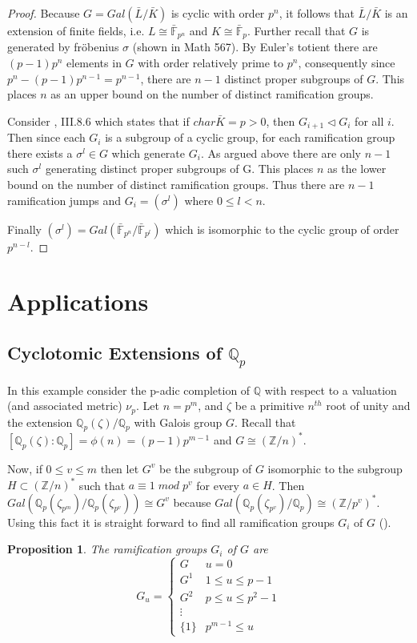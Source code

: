 \documentclass[paper=a4, fontsize=11pt]{scrartcl} %
\numberwithin{equation}{section} %
\numberwithin{figure}{section} %
\numberwithin{table}{section} %
\theoremstyle{break}
\newtheorem{prop}{Proposition}
\begin{document}
\begin{proof}
 Because $G=Gal(\bar{L}/\bar{K})$ is cyclic with order $p^n$, it follows that $\bar{L}/\bar{K}$ is an extension of finite fields, i.e. $L\cong \bar{\mathbb{F}}_{p^n}$ and $K\cong \bar{\mathbb{F}}_p$. Further recall that $G$ is generated by fr\"{o}benius $\sigma$ (shown in Math 567). By Euler's totient there are $(p-1)p^n$ elements in $G$ with order relatively prime to $p^n$, consequently since $p^n-(p-1)p^{n-1}=p^{n-1}$, there are $n-1$ distinct proper subgroups of $G$. This places $n$ as an upper bound on the number of distinct ramification groups.

Consider \cite{stitchenoth}, III.8.6 which states that if $char{\bar{K}} =p>0$, then $G_{i+1} \triangleleft G_i$ for all $i$. Then since each $G_i$ is a subgroup of a cyclic group, for each ramification group there exists a $\sigma^l\in G$ which generate $G_i$. As argued above there are only $n-1$ such $\sigma^{l}$ generating distinct proper subgroups of G. This places $n$ as the lower bound on the number of distinct ramification groups. Thus there are $n-1$ ramification jumps and $G_i = (\sigma^l)$ where $0 \leq l < n$.

Finally $(\sigma^l)=Gal(\bar{\mathbb{F}}_{p^n}/\bar{\mathbb{F}}_{p^l})$ which is isomorphic to the cyclic group of order $p^{n-l}$.
\end{proof}

\section{Applications}
\subsection{Cyclotomic Extensions of $\mathbb{Q}_p$}
In this example consider the p-adic completion of $\mathbb{Q}$ with respect to a valuation (and associated metric) $\nu_p$. Let $n=p^m$, and $\zeta$ be a primitive $n^{th}$ root of unity and the extension $\mathbb{Q}_p(\zeta)/\mathbb{Q}_p$ with Galois group $G$. Recall that $[\mathbb{Q}_p(\zeta):\mathbb{Q}_p]=\phi(n)=(p-1)p^{m-1}$ and $G\cong (\mathbb{Z}/n)^*$. 

Now, if $0 \leq v \leq m$ then let $G^v$ be the subgroup of $G$ isomorphic to the subgroup $H \subset (\mathbb{Z}/n)^*$ such that $a \equiv 1\;mod\;p^v$ for every $a\in H$. Then $Gal(\mathbb{Q}_p(\zeta_{p^m})/\mathbb{Q}_p(\zeta_{p^v})) \cong G^v$ because $Gal(\mathbb{Q}_p(\zeta_{p^v})/\mathbb{Q}_p) \cong (\mathbb{Z}/p^v)^*$. Using this fact it is straight forward to find all ramification groups $G_i$ of $G$ (\cite{Serre}).
\begin{prop}
The ramification groups $G_i$ of $G$ are
\[ G_u = \begin{cases} 
      G    & u=0 \\
      G^1  & 1 \leq u \leq p -1 \\
      G^2  & p \leq u \leq p^2 -1\\
      \vdots \\
      \{1\} & p^{m-1} \leq u
   \end{cases}
\]
\end{prop}
\end{document}
